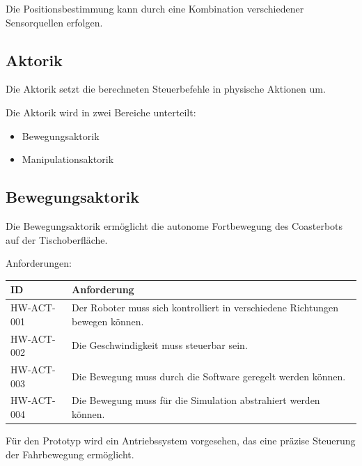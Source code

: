 Die Positionsbestimmung kann durch eine Kombination verschiedener
Sensorquellen erfolgen.

\subsection{Aktorik}\label{aktorik}

Die Aktorik setzt die berechneten Steuerbefehle in physische Aktionen
um.

Die Aktorik wird in zwei Bereiche unterteilt:

\begin{itemize}
\tightlist
\item
  Bewegungsaktorik
\item
  Manipulationsaktorik
\end{itemize}

\subsection{Bewegungsaktorik}\label{bewegungsaktorik}

Die Bewegungsaktorik ermöglicht die autonome Fortbewegung des
Coasterbots auf der Tischoberfläche.

Anforderungen:

\begin{longtable}[]{@{}
  >{\raggedright\arraybackslash}p{}
  >{\raggedright\arraybackslash}p{}@{}}
\toprule\noalign{}
\begin{minipage}[b]{\linewidth}\raggedright
ID
\end{minipage} & \begin{minipage}[b]{\linewidth}\raggedright
Anforderung
\end{minipage} \\
\midrule\noalign{}
\endhead
\bottomrule\noalign{}
\endlastfoot
HW-ACT-001 & Der Roboter muss sich kontrolliert in verschiedene
Richtungen bewegen können. \\
HW-ACT-002 & Die Geschwindigkeit muss steuerbar sein. \\
HW-ACT-003 & Die Bewegung muss durch die Software geregelt werden
können. \\
HW-ACT-004 & Die Bewegung muss für die Simulation abstrahiert werden
können. \\
\end{longtable}

Für den Prototyp wird ein Antriebssystem vorgesehen, das eine präzise
Steuerung der Fahrbewegung ermöglicht.

